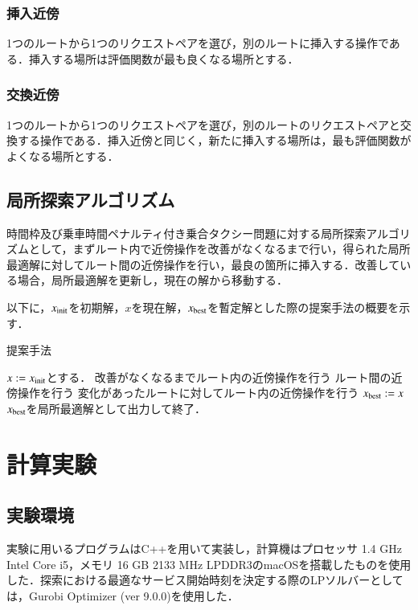 \documentclass[a4j,11pt,twocolumn]{jsarticle}
\begin{document}
\subsubsection{挿入近傍}
1つのルートから1つのリクエストペアを選び，別のルートに挿入する操作である．挿入する場所は評価関数が最も良くなる場所とする．
\subsubsection{交換近傍}
1つのルートから1つのリクエストペアを選び，別のルートのリクエストペアと交換する操作である．挿入近傍と同じく，新たに挿入する場所は，最も評価関数がよくなる場所とする．
\subsection{{\large 局所探索アルゴリズム}}
時間枠及び乗車時間ペナルティ付き乗合タクシー問題に対する局所探索アルゴリズムとして，まずルート内で近傍操作を改善がなくなるまで行い，得られた局所最適解に対してルート間の近傍操作を行い，最良の箇所に挿入する．改善している場合，局所最適解を更新し，現在の解から移動する．

以下に，$x_{\rm init}$を初期解，$x$を現在解，$x_{\rm best}$を暫定解とした際の提案手法の概要を示す．
\begin{algorithm}
 \caption{提案手法}
 \label{algo1}
 \begin{algorithmic}[1]%
  \STATE $x := x_{\rm init}$とする．
  \STATE 改善がなくなるまでルート内の近傍操作を行う
  \STATE ルート間の近傍操作を行う
  \STATE 変化があったルートに対してルート内の近傍操作を行う
  \STATE  $x_{\rm best} := x$
  \ENDIF
  \STATE $x_{\rm best}$を局所最適解として出力して終了．
 \end{algorithmic}
\end{algorithm}

\section{計算実験}
\subsection{実験環境}
実験に用いるプログラムはC++を用いて実装し，計算機はプロセッサ 1.4 GHz Intel Core i5，メモリ 16 GB 2133 MHz LPDDR3のmacOSを搭載したものを使用した．探索における最適なサービス開始時刻を決定する際のLPソルバーとしては，Gurobi Optimizer (ver 9.0.0)を使用した．
\end{document}
